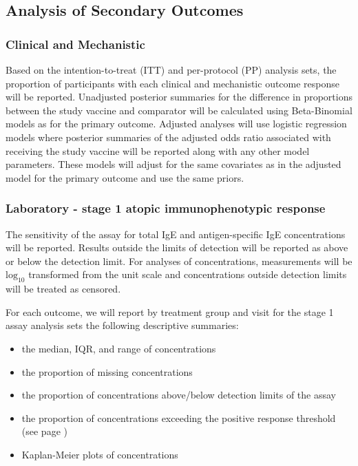 \documentclass{bmcart}
\begin{document}
\subsection*{Analysis of Secondary Outcomes}

\subsubsection*{Clinical and Mechanistic}

Based on the intention-to-treat (ITT) and per-protocol (PP) analysis sets, the proportion of participants with each clinical and mechanistic outcome response will be reported.
Unadjusted posterior summaries for the difference in proportions between the study vaccine and comparator will be calculated using Beta-Binomial models as for the primary outcome.
Adjusted analyses will use logistic regression models where posterior summaries of the adjusted odds ratio associated with receiving the study vaccine will be reported along with any other model parameters.
These models will adjust for the same covariates as in the adjusted model for the primary outcome and use the same priors.

\subsubsection*{Laboratory - stage 1 atopic immunophenotypic response}

The sensitivity of the assay for total IgE and antigen-specific IgE concentrations will be reported. 
Results outside the limits of detection will be reported as above or below the detection limit. 
For analyses of concentrations, measurements will be $\text{log}_{10}$ transformed from the unit scale and concentrations outside detection limits will be treated as censored.

For each outcome, we will report by treatment group and visit for the stage 1 assay analysis sets the following descriptive summaries:
\begin{itemize}
	\item the median, IQR, and range of concentrations
	\item the proportion of missing concentrations
	\item the proportion of concentrations above/below detection limits of the assay
	\item the proportion of concentrations exceeding the positive response threshold (see page \pageref{lab:sero-thresholds})
	\item Kaplan-Meier plots of concentrations
\end{itemize}
\end{document}
